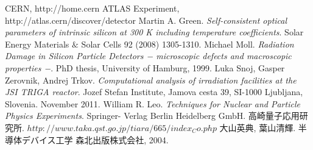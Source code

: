 \begin{thebibliography}{30}
%
CERN,
\newblock http://home.cern
%
ATLAS Experiment,
\newblock http://atlas.cern/discover/detector
%
Martin A. Green.
\newblock \textit{Self-consistent optical parameters of intrinsic silicon at 300 K including temperature coefficients}.
\newblock Solar Energy Materials $\&$ Solar Cells 92 (2008) 1305-1310.
%
Michael Moll.
\newblock \textit{Radiation Damage in Silicon Particle Detectors − microscopic defects and macroscopic properties −}.
\newblock PhD thesis, University of Hamburg, 1999.
%
Luka Snoj, Gasper Zerovnik, Andrej Trkov.
\newblock \textit{Computational analysis of irradiation facilities at the JSI TRIGA reactor}.
\newblock Jozef Stefan Institute, Jamova cesta 39, SI-1000 Ljubljana, Slovenia.
 November 2011.
%
William R. Leo.
\newblock \textit{Techniques for Nuclear and Particle Physics Experiments}.
\newblock Springer- Verlag Berlin Heidelberg GmbH.
%
高崎量子応用研究所.
\newblock $http://www.taka.qst.go.jp/tiara/665/index_Co.php$
%
大山英典, 葉山清輝.
\newblock 半導体デバイス工学
\newblock 森北出版株式会社, 2004.
%
\end{thebibliography}